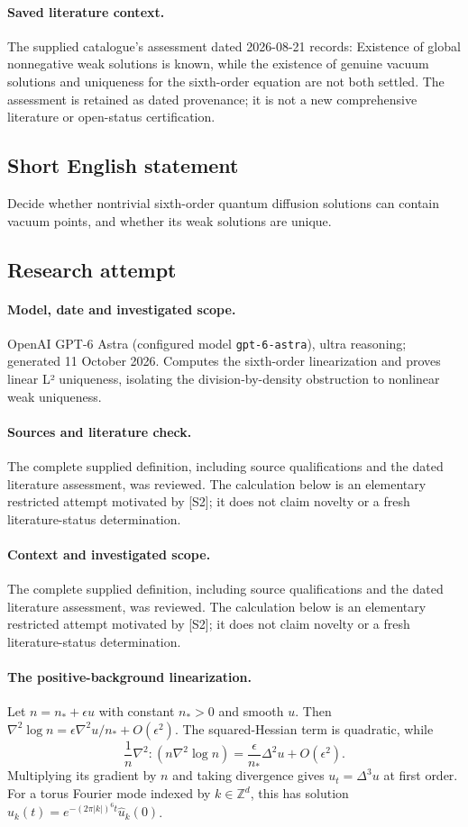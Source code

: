 \documentclass[11pt]{article}
\begin{document}
\paragraph{Saved literature context.} The supplied catalogue's assessment dated 2026-08-21 records: Existence of global nonnegative weak solutions is known, while the existence of genuine vacuum solutions and uniqueness for the sixth-order equation are not both settled. The assessment is retained as dated provenance; it is not a new comprehensive literature or open-status certification.
\subsection{Short English statement}
Decide whether nontrivial sixth-order quantum diffusion solutions can contain vacuum points, and whether its weak solutions are unique.
\subsection{Research attempt}
\paragraph{Model, date and investigated scope.}
OpenAI GPT-6 Astra (configured model \texttt{gpt-6-astra}), ultra reasoning; generated 11 October 2026. Computes the sixth-order linearization and proves linear L² uniqueness, isolating the division-by-density obstruction to nonlinear weak uniqueness.

\paragraph{Sources and literature check.}
The complete supplied definition, including source qualifications and the dated literature assessment, was reviewed. The calculation below is an elementary restricted attempt motivated by [S2]; it does not claim novelty or a fresh literature-status determination.

\paragraph{Context and investigated scope.} The complete supplied definition, including source qualifications and the dated literature assessment, was reviewed. The calculation below is an elementary restricted attempt motivated by [S2]; it does not claim novelty or a fresh literature-status determination.

\paragraph{The positive-background linearization.} Let $n=n_*+\epsilon u$ with constant $n_*>0$ and smooth $u$. Then $\nabla^2\log n=\epsilon\nabla^2u/n_*+O(\epsilon^2)$. The squared-Hessian term is quadratic, while
\[
 \frac1n\nabla^2\!:\!(n\nabla^2\log n)
 =\frac{\epsilon}{n_*}\Delta^2u+O(\epsilon^2).
\]
Multiplying its gradient by $n$ and taking divergence gives $u_t=\Delta^3u$ at first order. For a torus Fourier mode indexed by $k\in\mathbb Z^d$, this has solution $\widehat u_k(t)=e^{-(2\pi|k|)^6t}\widehat u_k(0)$.
\end{document}
